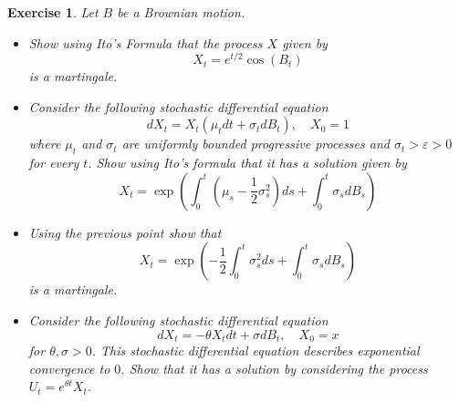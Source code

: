 \documentclass[DIV=classic,a4paper,10pt]{scrartcl}
\newtheorem{exercise}[theorem]{Exercise}
\theoremstyle{nonumberplain}
\numberwithin{equation}{section}
\begin{document}
\begin{exercise}
    Let $B$ be a Brownian motion.
    \begin{itemize}
        \item Show using Ito's Formula that the process $X$ given by
            \begin{equation*}
                X_t=e^{t/2}\cos\left( B_t \right)
            \end{equation*}
            is a martingale.
        \item Consider the following stochastic differential equation
            \begin{equation*}
                dX_t=X_t\left( \mu_t dt+\sigma_t dB_t \right), \quad X_0=1
            \end{equation*}
            where $\mu_t$ and $\sigma_t$ are uniformly bounded progressive processes and $\sigma_t>\varepsilon>0$ for every $t$.
            Show using Ito's formula that it has a solution given by
            \begin{equation*}
                X_t=\exp\left( \int_{0}^{t} \left( \mu_s-\frac{1}{2} \sigma_s^2 \right)ds+\int_{0}^{t}\sigma_s dB_s  \right)
            \end{equation*}
        \item Using the previous point show that
            \begin{equation*}
                X_t=\exp\left( -\frac{1}{2}\int_{0}^{t} \sigma_s^2 ds+\int_{0}^{t}\sigma_s dB_s  \right)
            \end{equation*}
            is a martingale.
        \item Consider the following stochastic differential equation
            \begin{equation*}
                dX_t=-\theta X_t dt+\sigma dB_t, \quad X_0=x
            \end{equation*}
            for $\theta, \sigma >0$.
            This stochastic differential equation describes exponential convergence to $0$.
            Show that it has a solution by considering the process $U_t=e^{\theta t}X_t$.
    \end{itemize}
\end{exercise}
\end{document}
